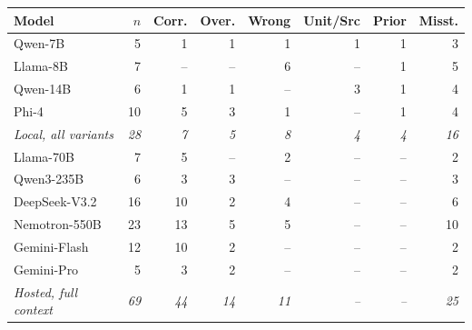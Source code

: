 \begin{tabular}{@{}lrrrrrrr@{}}
\toprule
Model & $n$ & Corr. & Over. & Wrong & Unit/Src & Prior & Misst. \\
\midrule
Qwen-7B & 5 & 1 & 1 & 1 & 1 & 1 & 3 \\
Llama-8B & 7 & -- & -- & 6 & -- & 1 & 5 \\
Qwen-14B & 6 & 1 & 1 & -- & 3 & 1 & 4 \\
Phi-4 & 10 & 5 & 3 & 1 & -- & 1 & 4 \\
\textit{Local, all variants} & \textit{28} & \textit{7} & \textit{5} & \textit{8} & \textit{4} & \textit{4} & \textit{16} \\
\midrule
Llama-70B & 7 & 5 & -- & 2 & -- & -- & 2 \\
Qwen3-235B & 6 & 3 & 3 & -- & -- & -- & 3 \\
DeepSeek-V3.2 & 16 & 10 & 2 & 4 & -- & -- & 6 \\
Nemotron-550B & 23 & 13 & 5 & 5 & -- & -- & 10 \\
Gemini-Flash & 12 & 10 & 2 & -- & -- & -- & 2 \\
Gemini-Pro & 5 & 3 & 2 & -- & -- & -- & 2 \\
\textit{Hosted, full context} & \textit{69} & \textit{44} & \textit{14} & \textit{11} & \textit{--} & \textit{--} & \textit{25} \\
\bottomrule
\end{tabular}
